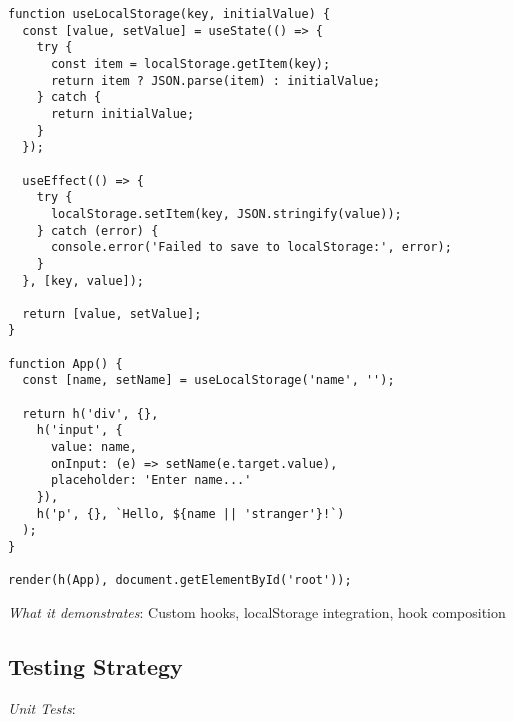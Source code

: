 \documentclass[11pt]{article}
\begin{document}
\begin{verbatim}
function useLocalStorage(key, initialValue) {
  const [value, setValue] = useState(() => {
    try {
      const item = localStorage.getItem(key);
      return item ? JSON.parse(item) : initialValue;
    } catch {
      return initialValue;
    }
  });
  
  useEffect(() => {
    try {
      localStorage.setItem(key, JSON.stringify(value));
    } catch (error) {
      console.error('Failed to save to localStorage:', error);
    }
  }, [key, value]);
  
  return [value, setValue];
}

function App() {
  const [name, setName] = useLocalStorage('name', '');
  
  return h('div', {},
    h('input', {
      value: name,
      onInput: (e) => setName(e.target.value),
      placeholder: 'Enter name...'
    }),
    h('p', {}, `Hello, ${name || 'stranger'}!`)
  );
}

render(h(App), document.getElementById('root'));
\end{verbatim}

\emph{What it demonstrates}: Custom hooks, localStorage integration, hook composition
\subsection{Testing Strategy}
\label{sec:org79abd05}

\emph{Unit Tests}:
\end{document}

